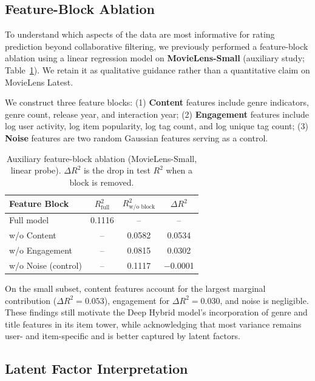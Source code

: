 \documentclass[11pt]{article}
\begin{document}
\subsection{Feature-Block Ablation}
\label{sec:ablation}

To understand which aspects of the data are most informative for rating prediction beyond collaborative filtering, we previously performed a feature-block ablation using a linear regression model on \textbf{MovieLens-Small} (auxiliary study; Table~\ref{tab:ablation}).
We retain it as qualitative guidance rather than a quantitative claim on MovieLens Latest.

We construct three feature blocks: (1) \textbf{Content} features include genre indicators, genre count, release year, and interaction year; (2) \textbf{Engagement} features include log user activity, log item popularity, log tag count, and log unique tag count; (3) \textbf{Noise} features are two random Gaussian features serving as a control.

\begin{table}[t]
\centering
\small
\begin{tabular}{lccc}
\toprule
\textbf{Feature Block} & $R^2_\text{full}$ & $R^2_\text{w/o block}$ & $\Delta R^2$ \\
\midrule
Full model & 0.1116 & -- & -- \\
\midrule
w/o Content & -- & 0.0582 & 0.0534 \\
w/o Engagement & -- & 0.0815 & 0.0302 \\
w/o Noise (control) & -- & 0.1117 & $-$0.0001 \\
\bottomrule
\end{tabular}
\caption{Auxiliary feature-block ablation (MovieLens-Small, linear probe).  $\Delta R^2$ is the drop in test $R^2$ when a block is removed.}
\label{tab:ablation}
\end{table}

On the small subset, content features account for the largest marginal contribution ($\Delta R^2 = 0.053$), engagement for $\Delta R^2 = 0.030$, and noise is negligible.
These findings still motivate the Deep Hybrid model's incorporation of genre and title features in its item tower, while acknowledging that most variance remains user- and item-specific and is better captured by latent factors.


\subsection{Latent Factor Interpretation}
\end{document}
